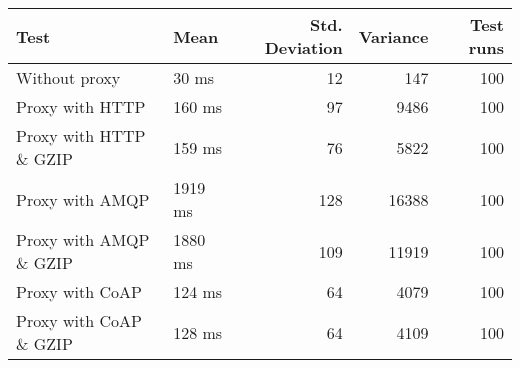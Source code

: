 \begin{tabularx}{\textwidth}{llrrr}
\hline
 Test                   & Mean    &   Std. Deviation &   Variance &   Test runs \\
\hline
 Without proxy          & 30 ms   &               12 &        147 &         100 \\
 Proxy with HTTP        & 160 ms  &               97 &       9486 &         100 \\
 Proxy with HTTP \& GZIP & 159 ms  &               76 &       5822 &         100 \\
 Proxy with AMQP        & 1919 ms &              128 &      16388 &         100 \\
 Proxy with AMQP \& GZIP & 1880 ms &              109 &      11919 &         100 \\
 Proxy with CoAP        & 124 ms  &               64 &       4079 &         100 \\
 Proxy with CoAP \& GZIP & 128 ms  &               64 &       4109 &         100 \\
\hline
\end{tabularx}